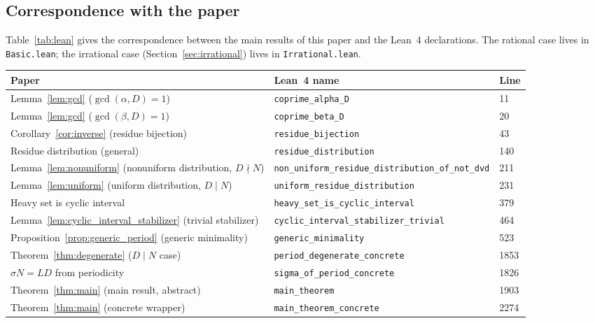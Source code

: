 \documentclass[11pt,reqno]{amsart}
\theoremstyle{plain}
\theoremstyle{definition}
\theoremstyle{remark}
\begin{document}
\subsection{Correspondence with the paper}\label{subsec:lean_corr}

Table~\ref{tab:lean} gives the correspondence between the main
results of this paper and the Lean~4 declarations.  The rational
case lives in \texttt{Basic.lean}; the irrational case
(Section~\ref{sec:irrational}) lives in \texttt{Irrational.lean}.

\begin{table}[ht]
\centering
\footnotesize
\setlength{\tabcolsep}{4pt}
\begin{tabular}{lll}
\hline
\textbf{Paper} & \textbf{Lean~4 name} & \textbf{Line} \\
\hline
Lemma~\ref{lem:gcd} (\(\gcd(\alpha,D)=1\))
  & \texttt{coprime\_alpha\_D} & 11 \\
Lemma~\ref{lem:gcd} (\(\gcd(\beta,D)=1\))
  & \texttt{coprime\_beta\_D} & 20 \\
Corollary~\ref{cor:inverse} (residue bijection)
  & \texttt{residue\_bijection} & 43 \\
Residue distribution (general)
  & \texttt{residue\_distribution} & 140 \\
Lemma~\ref{lem:nonuniform} (nonuniform distribution, \(D \nmid N\))
  & \texttt{non\_uniform\_residue\_distribution\_of\_not\_dvd} & 211 \\
Lemma~\ref{lem:uniform} (uniform distribution, \(D \mid N\))
  & \texttt{uniform\_residue\_distribution} & 231 \\
Heavy set is cyclic interval
  & \texttt{heavy\_set\_is\_cyclic\_interval} & 379 \\
Lemma~\ref{lem:cyclic_interval_stabilizer} (trivial stabilizer)
  & \texttt{cyclic\_interval\_stabilizer\_trivial} & 464 \\
Proposition~\ref{prop:generic_period} (generic minimality)
  & \texttt{generic\_minimality} & 523 \\
Theorem~\ref{thm:degenerate} (\(D \mid N\) case)
  & \texttt{period\_degenerate\_concrete} & 1853 \\
\(\sigma N = LD\) from periodicity
  & \texttt{sigma\_of\_period\_concrete} & 1826 \\
Theorem~\ref{thm:main} (main result, abstract)
  & \texttt{main\_theorem} & 1903 \\
Theorem~\ref{thm:main} (concrete wrapper)
  & \texttt{main\_theorem\_concrete} & 2274 \\

\end{tabular}
\end{table}
\end{document}
